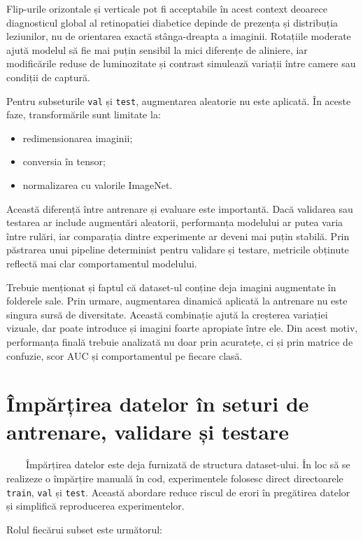 \documentclass[12pt, a4paper, oneside, romanian]{teza-upb}
\begin{document}
Flip-urile orizontale și verticale pot fi acceptabile în acest context deoarece diagnosticul global al retinopatiei diabetice depinde de prezența și distribuția leziunilor, nu de orientarea exactă stânga-dreapta a imaginii. Rotațiile moderate ajută modelul să fie mai puțin sensibil la mici diferențe de aliniere, iar modificările reduse de luminozitate și contrast simulează variații între camere sau condiții de captură.
\bigskip

Pentru subseturile \texttt{val} și \texttt{test}, augmentarea aleatorie nu este aplicată. În aceste faze, transformările sunt limitate la:

\begin{itemize}
  \item redimensionarea imaginii;
  \item conversia în tensor;
  \item normalizarea cu valorile ImageNet.
\end{itemize}

Această diferență între antrenare și evaluare este importantă. Dacă validarea sau testarea ar include augmentări aleatorii, performanța modelului ar putea varia între rulări, iar comparația dintre experimente ar deveni mai puțin stabilă. Prin păstrarea unui pipeline determinist pentru validare și testare, metricile obținute reflectă mai clar comportamentul modelului.
\bigskip

Trebuie menționat și faptul că dataset-ul conține deja imagini augmentate în folderele sale. Prin urmare, augmentarea dinamică aplicată la antrenare nu este singura sursă de diversitate. Această combinație ajută la creșterea variației vizuale, dar poate introduce și imagini foarte apropiate între ele. Din acest motiv, performanța finală trebuie analizată nu doar prin acuratețe, ci și prin matrice de confuzie, scor AUC și comportamentul pe fiecare clasă.

\section{Împărțirea datelor în seturi de antrenare, validare și testare}

\ \ \ \ Împărțirea datelor este deja furnizată de structura dataset-ului. În loc să se realizeze o împărțire manuală în cod, experimentele folosesc direct directoarele \texttt{train}, \texttt{val} și \texttt{test}. Această abordare reduce riscul de erori în pregătirea datelor și simplifică reproducerea experimentelor.
\bigskip

Rolul fiecărui subset este următorul:
\end{document}
